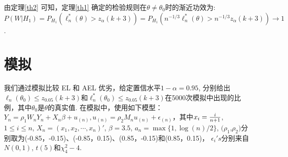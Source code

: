\documentclass[a4paper,c5size,onecolumn,twoside,cap,Chinese]{APSart}
\begin{document}
由定理\ref{th2} 可知，定理\ref{th1} 确定的检验规则在$\theta \neq \theta_0$时的渐近功效为:
$P(W|H_1)=P_{H_1}(\ell^*_n(\theta) > z_{\alpha}(k+3))=P_{H_1}(n^{-1/3}\ell^*_n(\theta) > n^{-1/3}z_{\alpha}(k+3))\to 1$.

\section{模\hy\hy\hy 拟}
我们通过模拟比较 EL 和 AEL 优劣，给定置信水平$1-\alpha=0.95$, 分别给出$ \ell_n(\theta_0)\leq z_{0.05}(k+3)$和$ \ell^*_n(\theta_0)\leq z_{0.05}(k+3)$在5000次模拟中出现的比例，其中$\theta_0$是$\theta$的真实值. 在模拟中，使用如下模型：$  Y_{n} =\rho_1W_nY_n+X_n\beta+u_{(n)}, u_{(n)}=\rho_2M_nu_{(n)}+\epsilon_{(n)} $，其中$x_i={i\over n+1}$, $1 \le i \le n$, $X_n=(x_1,x_2,\cdots,x_n)'$,  $\beta=3.5$, $a_n=\max\{1,\log(n)/2\}$, $(\rho_{1}$,$\rho_{2})$分别取为(-0.85，-0.15)、(-0.85，0.15)、(0.85，-0.15)和(0.85，0.15)， $\epsilon_{i}'s$分别来自$ N(0, 1)$,  $t(5)$和$\chi^2_{4}-4$.



\begingroup					%
\renewcommand{\arraystretch}{0.85} %
\end{document}
